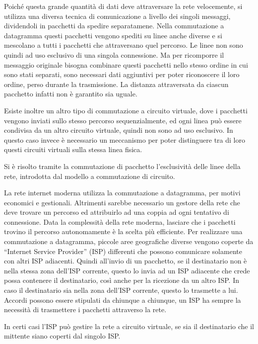 \documentclass{article}
\numberwithin{equation}{subsection}
\begin{document}
Poiché questa grande quantità di dati deve attraversare la rete velocemente, si utilizza una diversa tecnica di comunicazione a livello dei singoli messaggi, dividendoli 
in pacchetti da spedire separatamene. Nella commutazione a datagramma questi pacchetti vengono spediti su linee anche diverse e si mescolano a tutti i pacchetti che 
attraversano quel percorso. Le linee non sono quindi ad uso esclusivo di una singola connessione. 
Ma per ricomporre il messaggio originale bisogna combinare questi pacchetti nello stesso ordine in cui sono stati separati, sono necessari dati aggiuntivi per 
poter riconoscere il loro ordine, perso durante la trasmissione. La distanza attraversata da ciascun pacchetto infatti non è garantito sia uguale. 

Esiste inoltre un altro tipo di commutazione a circuito virtuale, dove i pacchetti vengono inviati sullo stesso percorso sequenzialmente, ed ogni linea può essere 
condivisa da un altro circuito virtuale, quindi non sono ad uso esclusivo. In questo caso invece è necessario un meccanismo per poter distinguere tra di loro 
questi circuiti virtuali sulla stessa linea fisica. 

Si è risolto tramite la commutazione di pacchetto l'esclusività delle linee della rete, introdotta dal modello a commutazione di circuito. 


La rete internet moderna utilizza la commutazione a datagramma, per motivi economici e gestionali. Altrimenti sarebbe necessario un gestore della rete che deve trovare 
un percorso ed attribuirlo ad una coppia ad ogni tentativo di connessione. Data la complessità della rete moderna, lasciare che i pacchetti trovino il percorso 
autonomamente è la scelta più efficiente. 
Per realizzare una commutazione a datagramma, piccole aree geografiche diverse vengono coperte da ``Internet Service Provider'' (ISP) differenti che possono comunicare 
solamente con altri ISP adiacenti. Quindi all'invio di un pacchetto, se il destinatario non è nella stessa zona dell'ISP corrente, questo lo invia ad un ISP adiacente 
che crede possa contenere il destinatario, così anche per la ricezione da un altro ISP. In caso il destinatario sia nella zona dell'ISP corrente, questo lo trasmette a lui. 
Accordi possono essere stipulati da chiunque a chiunque, un ISP ha sempre la necessità di trasmettere i pacchetti attraverso la rete. 

In certi casi l'ISP può gestire la rete a circuito virtuale, se sia il destinatario che il mittente siano coperti dal singolo ISP. 
\end{document}
